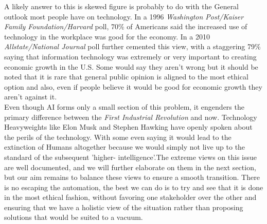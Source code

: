 	A likely answer to this is skewed figure is probably to do with the General outlook most people have on technology. In a 1996 \textit{Washington Post/Kaiser Family Foundation/Harvard} poll, 70\% of Americans said the increased use of technology in the workplace was good for the economy. In a 2010 \textit{Allstate/National Journal} poll further cemented this view, with a staggering 79\% saying that information technology was extremely or very important to creating economic growth in the U.S. Some would say they aren't wrong but it should be noted that it is rare that general public opinion is aligned to the most ethical option and also, even if people believe it would be good for economic growth they aren't against it.\\
	Even though AI forms only a small section of this problem, it engenders the primary difference between the \textit{First Industrial Revolution} and now. Technology Heavyweights like Elon Musk and Stephen Hawking have openly spoken about the perils of the technology. With some even saying it would lead to the extinction of Humans altogether because we would simply not live up to the standard of the subsequent 'higher- intelligence'.The extreme views on this issue are well documented, and we will further elaborate on them in the next section, but our aim remains to balance these views to ensure a smooth transition. There is no escaping the automation, the best we can do is to try and see that it is done in the most ethical fashion, without favoring one stakeholder over the other and ensuring that we have a holistic view of the situation rather than proposing solutions that would be suited to a vacuum.
